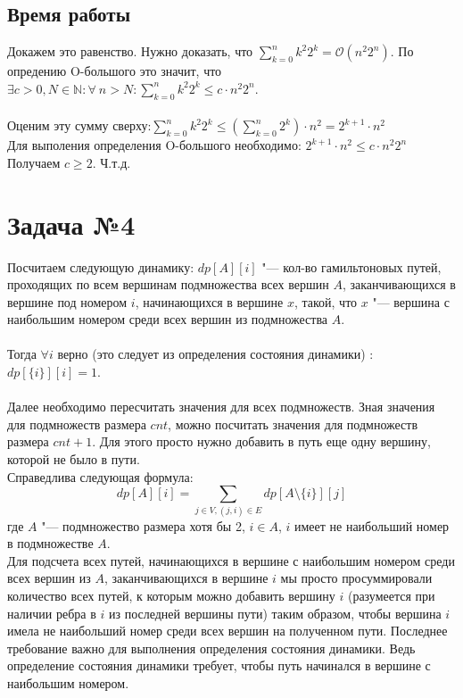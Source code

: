 \documentclass{article}
\begin{document}
\subsection*{Время работы}
Докажем это равенство. 
Нужно доказать, что $\sum_{k = 0}^{n}k^{2}2^{k} = \mathcal{O}(n^{2}2^{n})$. По опредению O-большого это значит, что $\exists c > 0, N \in \mathbb{N} : \forall \ n > N : \sum_{k = 0}^{n}k^{2}2^{k} \leq c \cdot n^{2}2^{n}$. \\\\
Оценим эту сумму сверху:$\sum_{k = 0}^{n}k^{2}2^{k} \leq (\sum_{k = 0}^{n}2^{k})\cdot n^{2} = 2^{k + 1}\cdot n^{2}$\\ Для выполения определения O-большого необходимо: $2^{k + 1}\cdot n^{2} \leq c \cdot n^{2}2^{n}$
Получаем $c \geq 2$. Ч.т.д.
\section*{Задача №4}
Посчитаем следующую динамику: $dp[A][i]$ "--- кол-во гамильтоновых путей, проходящих по всем вершинам подмножества всех вершин $A$, заканчивающихся в вершине под номером $i$, начинающихся в вершине $x$, такой, что $x$ "--- вершина с наибольшим номером среди всех вершин из подмножества $A$.\\\\
Тогда $\forall i$ верно (это следует из определения состояния динамики) : $dp[\{i\}][i] = 1$.\\\\
Далее необходимо пересчитать значения для всех подмножеств. Зная значения для подмножеств размера $cnt$, можно посчитать значения для подмножеств размера $cnt + 1$. Для этого просто нужно добавить в путь еще одну вершину, которой не было в пути. \\Справедлива следующая формула: 
\begin{equation}
dp[A][i] = \sum_{j \in V, (j, i) \in E}dp[A\setminus \{i\}][j]
\end{equation} где $A$ "--- подмножество размера хотя бы 2, $i \in A$, $i$ имеет не наибольший номер в подмножестве $A$.\\ Для подсчета всех путей, начинающихся в вершине с наибольшим номером среди всех вершин из $A$, заканчивающихся в вершине $i$ мы просто просуммировали количество всех путей, к которым можно добавить вершину $i$ (разумеется при наличии ребра в $i$ из последней вершины пути) таким образом, чтобы вершина $i$ имела не наибольший номер среди всех вершин на полученном пути. Последнее требование важно для выполнения определения состояния динамики. Ведь определение состояния динамики требует, чтобы путь начинался в вершине с наибольшим номером.\\\\
\end{document}
